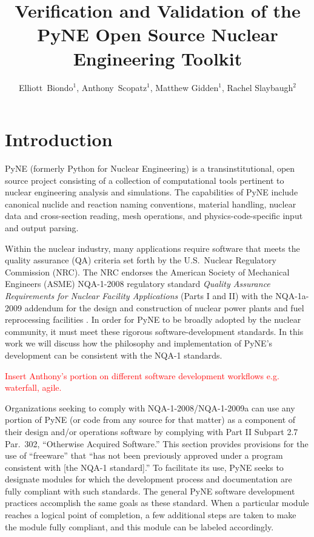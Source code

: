 \documentclass{anstrans}
\title{Verification and Validation of the PyNE Open Source Nuclear Engineering Toolkit}
\author{Elliott~Biondo$^{1}$, Anthony~Scopatz$^{1}$, Matthew Gidden$^{1}$, Rachel Slaybaugh$^{2}$}
\institute{
\and $^{1}$ The University of Wisconsin-Madison, 1500 Engineering Drive, Madison, WI 53706\\
\and $^{2}$ The University of California, Berkeley, 2521 Hearst Ave, Berkeley, CA 94709 \\
}
\begin{document}
\section{Introduction}

PyNE \cite{scopatz_pyne} (formerly Python for Nuclear Engineering) is a
transinstitutional, open source project consisting of a collection of
computational tools pertinent to nuclear engineering analysis and simulations.
The capabilities of PyNE include canonical nuclide and reaction naming
conventions, material handling, nuclear data and cross-section reading, mesh
operations, and physics-code-specific input and output parsing. %

Within the nuclear industry, many applications require software that meets
the quality assurance (QA) criteria set forth by the U.S.\ Nuclear Regulatory
Commission (NRC). The NRC endorses the American Society of Mechanical Engineers
(ASME) NQA-1-2008 regulatory standard \emph{Quality Assurance Requirements for
Nuclear Facility Applications} (Parts I and II) \cite{nrc} with the NQA-1a-2009
addendum \cite{add} for the design and construction of nuclear power plants and
fuel reprocessing facilities \cite{nrc}. 
In order for PyNE to be broadly adopted by the nuclear community, it must meet these rigorous software-development standards.
In this work we will discuss how the philosophy and implementation of PyNE's development can be consistent with the NQA-1 standards.

\textcolor{red}{Insert Anthony's portion on different software development
workflows e.g. waterfall, agile.}

Organizations seeking to comply with NQA-1-2008/NQA-1-2009a can use any
portion of PyNE (or code from any source for that matter) as a component of
their design and/or operations software by complying with Part II Subpart 2.7
Par.\ 302, ``Otherwise Acquired Software.'' This section provides provisions for the
use of ``freeware'' that ``has not been previously approved under a
program consistent with [the NQA-1 standard].'' To facilitate its use, PyNE seeks to
designate modules for which the development process and documentation are
fully compliant with such standards. The general PyNE software
development practices accomplish the same goals as these standard. When a particular
module reaches a logical point of completion, a few additional steps are
taken to make the module fully compliant, and this module can be labeled accordingly.
\end{document}
